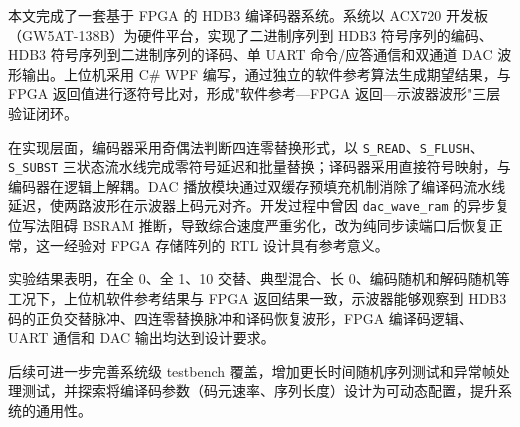 \documentclass[UTF8,a4paper,12pt]{ctexart}
\begin{document}
本文完成了一套基于 FPGA 的 HDB3 编译码器系统。系统以 ACX720 开发板（GW5AT-138B）为硬件平台，实现了二进制序列到 HDB3 符号序列的编码、HDB3 符号序列到二进制序列的译码、单 UART 命令/应答通信和双通道 DAC 波形输出。上位机采用 C\# WPF 编写，通过独立的软件参考算法生成期望结果，与 FPGA 返回值进行逐符号比对，形成"软件参考—FPGA 返回—示波器波形"三层验证闭环。

在实现层面，编码器采用奇偶法判断四连零替换形式，以 \texttt{S\_READ}、\texttt{S\_FLUSH}、\texttt{S\_SUBST} 三状态流水线完成零符号延迟和批量替换；译码器采用直接符号映射，与编码器在逻辑上解耦。DAC 播放模块通过双缓存预填充机制消除了编译码流水线延迟，使两路波形在示波器上码元对齐。开发过程中曾因 \texttt{dac\_wave\_ram} 的异步复位写法阻碍 BSRAM 推断，导致综合速度严重劣化，改为纯同步读端口后恢复正常，这一经验对 FPGA 存储阵列的 RTL 设计具有参考意义。

实验结果表明，在全 0、全 1、10 交替、典型混合、长 0、编码随机和解码随机等工况下，上位机软件参考结果与 FPGA 返回结果一致，示波器能够观察到 HDB3 码的正负交替脉冲、四连零替换脉冲和译码恢复波形，FPGA 编译码逻辑、UART 通信和 DAC 输出均达到设计要求。

后续可进一步完善系统级 testbench 覆盖，增加更长时间随机序列测试和异常帧处理测试，并探索将编译码参数（码元速率、序列长度）设计为可动态配置，提升系统的通用性。
\end{document}
